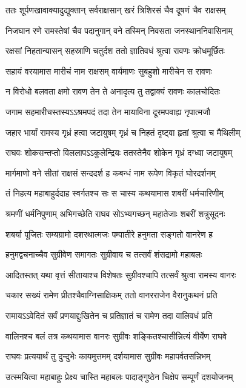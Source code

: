 \twolineshloka
{ततः शूर्पणखावाक्यादुद्युक्तान् सर्वराक्षसान्}
{खरं त्रिशिरसं चैव दूषणं चैव राक्षसम्}%

\twolineshloka
{निजघान रणे रामस्तेषां चैव पदानुगान्}
{वने तस्मिन् निवसता जनस्थाननिवासिनाम्}%

\twolineshloka
{रक्षसां निहतान्यासन् सहस्राणि चतुर्दश}
{ततो ज्ञातिवधं श्रुत्वा रावणः क्रोधमूर्छितः}%

\twolineshloka
{सहायं वरयामास मारीचं नाम राक्षसम्}
{वार्यमाणः सुबहुशो मारीचेन स रावणः}%

\twolineshloka
{न विरोधो बलवता क्षमो रावण तेन ते}
{अनादृत्य तु तद्वाक्यं रावणः कालचोदितः}%

\twolineshloka
{जगाम सहमारीचस्तस्यऽऽश्रमपदं तदा}
{तेन मायाविना दूरमपवाह्य नृपात्मजौ}%

\twolineshloka
{जहार भार्यां रामस्य गृध्रं हत्वा जटायुषम्}
{गृध्रं च निहतं दृष्ट्वा हृतां श्रुत्वा च मैथिलीम्}%

\twolineshloka
{राघवः शोकसन्तप्तो विललापऽऽकुलेन्द्रियः}
{ततस्तेनैव शोकेन गृध्रं दग्ध्वा जटायुषम्}%

\twolineshloka
{मार्गमाणो वने सीतां राक्षसं सन्ददर्श ह}
{कबन्धं नाम रूपेण विकृतं घोरदर्शनम्}%

\twolineshloka
{तं निहत्य महाबाहुर्ददाह स्वर्गतश्च सः}
{स चास्य कथयामास शबरीं धर्मचारिणीम्}%

\twolineshloka
{श्रमणीं धर्मनिपुणाम् अभिगच्छेति राघव}
{सोऽभ्यगच्छन् महातेजाः शबरीं शत्रुसूदनः}%

\twolineshloka
{शबर्या पूजितः सम्यग्रामो दशरथात्मजः}
{पम्पातीरे हनुमता सङ्गतो वानरेण ह}%

\twolineshloka
{हनुमद्वचनाच्चैव सुग्रीवेण समागतः}
{सुग्रीवाय च तत्सर्वं शंसद्रामो महाबलः}%

\twolineshloka
{आदितस्तत् यथा वृत्तं सीतायाश्च विशेषतः}
{सुग्रीवश्चापि तत्सर्वं श्रुत्वा रामस्य वानरः}%

\twolineshloka
{चकार सख्यं रामेण प्रीतश्चैवाग्निसाक्षिकम्}
{ततो वानरराजेन वैरानुकथनं प्रति}%

\twolineshloka
{रामायऽऽवेदितं सर्वं प्रणयाद्दुःखितेन च}
{प्रतिज्ञातं च रामेण तदा वालिवधं प्रति}%

\twolineshloka
{वालिनश्च बलं तत्र कथयामास वानरः}
{सुग्रीवः शङ्कितश्चासीन्नित्यं वीर्येण राघवे}%

\twolineshloka
{राघवः प्रत्ययार्थं तु दुन्दुभेः कायमुत्तमम्}
{दर्शयामास सुग्रीवः महापर्वतसन्निभम्}%

\twolineshloka
{उत्स्मयित्वा महाबाहुः प्रेक्ष्य चास्ति महाबलः}
{पादाङ्गुष्ठेन चिक्षेप सम्पूर्णं दशयोजनम्}%

